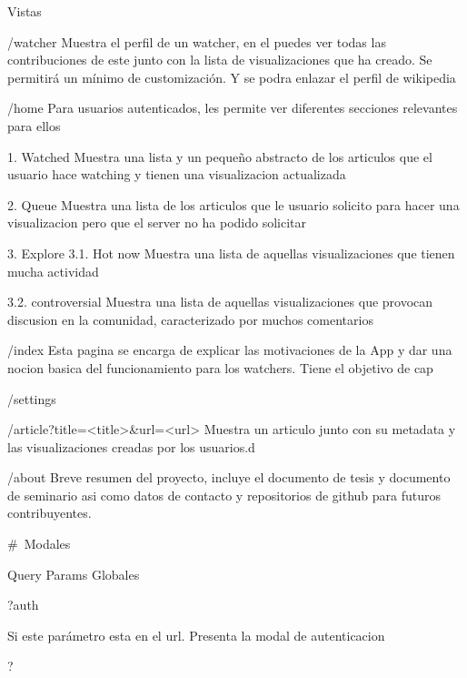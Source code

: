 Vistas


/watcher
Muestra el perfil de un watcher, en el puedes ver todas las contribuciones de este junto con la lista de visualizaciones que ha creado.
Se permitirá un mínimo de customización. Y se podra enlazar el perfil de wikipedia


/home
Para usuarios autenticados, les permite ver diferentes secciones relevantes para ellos

1. Watched
    Muestra una lista y un pequeño abstracto de los articulos que el usuario hace watching y tienen una visualizacion actualizada

2. Queue
    Muestra una lista de los articulos que le usuario solicito para hacer una visualizacion pero que el server no ha podido solicitar

3. Explore
    3.1. Hot now
    Muestra una lista de aquellas visualizaciones que tienen mucha actividad 

    3.2. controversial
    Muestra una lista de aquellas visualizaciones que provocan discusion en la comunidad, caracterizado por muchos comentarios


/index
Esta pagina se encarga de explicar las motivaciones de la App y dar una nocion basica del funcionamiento para los watchers.
Tiene el objetivo de cap


/settings



/article?title=<title>&url=<url>
Muestra un articulo junto con su metadata y las visualizaciones creadas por los usuarios.d



/about
Breve resumen del proyecto, incluye el documento de tesis y documento de seminario asi como datos de contacto y repositorios de github para futuros contribuyentes.

# Modales

Query Params Globales

?auth

Si este parámetro esta en el url. Presenta la modal de autenticacion 

?

